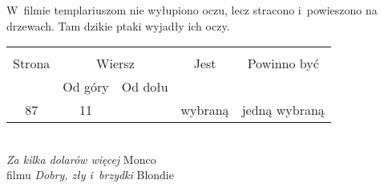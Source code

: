 \documentclass[a4paper,11pt]{article}
\begin{document}






\newpage
{}

\vspace{\spaceThree}





\start {} W~filmie templariuszom nie wyłupiono oczu, lecz
stracono i~powieszono na drzewach. Tam dzikie ptaki wyjadły ich oczy.

\begin{center}
  \begin{tabular}{|c|c|c|c|c|}
    \hline
    & \multicolumn{2}{c|}{} & & \\
    Strona & \multicolumn{2}{c|}{Wiersz} & Jest
                              & Powinno być \\ \cline{2-3}
    & Od góry & Od dołu & & \\
    \hline
    87 & 11 & & wybraną & jedną wybraną \\
    \hline
  \end{tabular}
\end{center}
\noi
{} \\
\Jest \emph{Za kilka dolarów więcej} Monco \\
\Pow filmu \emph{Dobry, zły i~brzydki} Blondie \\
\end{document}
